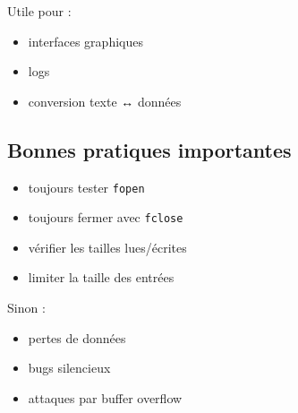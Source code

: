 Utile pour :

\begin{itemize}
    \item interfaces graphiques
    \item logs
    \item conversion texte ↔ données
\end{itemize}

\subsection{Bonnes pratiques importantes}

\begin{itemize}
    \item toujours tester \texttt{fopen}
    \item toujours fermer avec \texttt{fclose}
    \item vérifier les tailles lues/écrites
    \item limiter la taille des entrées
\end{itemize}

Sinon :

\begin{itemize}
    \item pertes de données
    \item bugs silencieux
    \item attaques par buffer overflow
\end{itemize}
